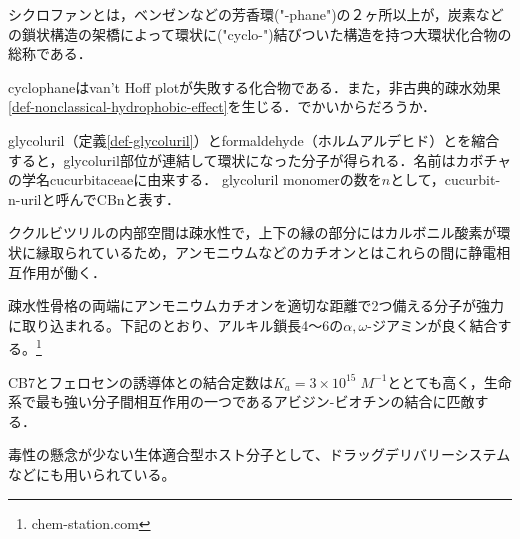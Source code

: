 \documentclass[uplatex, dvipdfmx]{jsreport}
\begin{document}
\begin{definition}[cyclophane]\label{def-cyclophane}
    シクロファンとは，ベンゼンなどの芳香環("-phane")の２ヶ所以上が，炭素などの鎖状構造の架橋によって環状に("cyclo-")結びついた構造を持つ大環状化合物の総称である．
\end{definition}
\begin{remark}
    cyclophaneはvan't Hoff plotが失敗する化合物である．また，非古典的疎水効果\ref{def-nonclassical-hydrophobic-effect}を生じる．でかいからだろうか．
\end{remark}

\begin{definition}[cucurbituril]
    glycoluril（定義\ref{def-glycoluril}）とformaldehyde（ホルムアルデヒド）とを縮合すると，glycoluril部位が連結して環状になった分子が得られる．名前はカボチャの学名cucurbitaceaeに由来する．
    glycoluril monomerの数を$n$として，cucurbit-n-urilと呼んでCBnと表す．
\end{definition}
\begin{example}[ククルビツリル]
    ククルビツリルの内部空間は疎水性で，上下の縁の部分にはカルボニル酸素が環状に縁取られているため，アンモニウムなどのカチオンとはこれらの間に静電相互作用が働く．

    疎水性骨格の両端にアンモニウムカチオンを適切な距離で2つ備える分子が強力に取り込まれる。下記のとおり、アルキル鎖長4～6の$\alpha,\omega$-ジアミンが良く結合する。\footnote{chem-station.com}

    CB7とフェロセンの誘導体との結合定数は$K_a=3\times 10^{15}\;M^{-1}$ととても高く，生命系で最も強い分子間相互作用の一つであるアビジン-ビオチンの結合に匹敵する．

    毒性の懸念が少ない生体適合型ホスト分子として、ドラッグデリバリーシステムなどにも用いられている。
\end{example}
\end{document}
